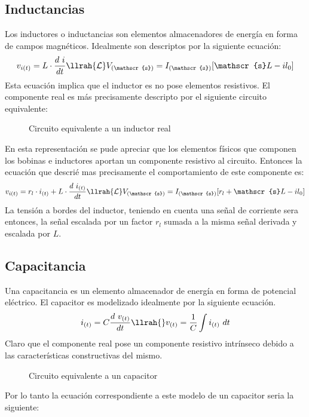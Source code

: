 \subsection{Inductancias}\label{sec:Ind}
Los inductores o inductancias son elementos almacenadores de energía en forma de campos magnéticos. Idealmente son descriptos por la siguiente ecuación:
\begin{equation}
    v_{i(t)}=L\cdot\frac{d~i}{dt}\llrah{\mathcal{L}} V_{(\mathscr{s})}=I_{(\mathscr{s})}[\mathscr{s}L-il_{0}]
\end{equation}
Esta ecuación implica que el inductor es no pose elementos resistivos. 
El componente real es más precisamente descripto por el siguiente circuito equivalente:
\begin{figure}[H]
    \centering
    
    \caption{Circuito equivalente a un inductor real}
    \label{fig:CircInd}
\end{figure}

En esta representación se pude apreciar que los elementos físicos que componen los bobinas e inductores aportan un componente resistivo al circuito. Entonces la ecuación que descrié mas precisamente el comportamiento de este componente es:
\begin{equation}
    v_{i(t)}=r_l\cdot i_{(t)}+L\cdot\frac{d~i_{(t)}}{dt}\llrah{\mathcal{L}} V_{(\mathscr{s})}=I_{(\mathscr{s})}[r_l+\mathscr{s}L-il_{0}]
    \label{eq:InducGn}
\end{equation}
La tensión a bordes del inductor, teniendo en cuenta una señal de corriente sera entonces, la señal escalada por un factor $r_l$ sumada a la misma señal derivada y escalada por $L$. 

\subsection{Capacitancia}\label{sec:Cap}
Una capacitancia es un elemento almacenador de energía en forma de potencial eléctrico. El capacitor es modelizado idealmente por la siguiente ecuación.
\begin{equation}
    i_{(t)}=C\frac{d~v_{(t)}}{dt}\llrah{}v_{(t)}=\frac{1}{C}\int i_{(t)}~dt
\end{equation}
Claro que el componente real pose un componente resistivo intrínseco debido a las características constructivas del mismo.
\begin{figure}[H]
    \centering
    
    \caption{Circuito equivalente a un capacitor}
    \label{fig:CircCap}
\end{figure}
Por lo tanto la ecuación correspondiente a este modelo de un capacitor seria la siguiente:

